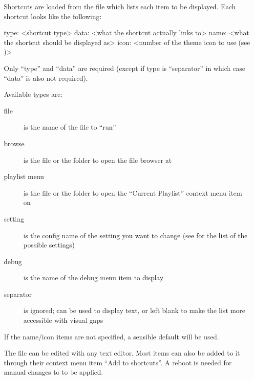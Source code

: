 
Shortcuts are loaded from the file  which lists
each item to be displayed. Each shortcut looks like the following:

\begin{example}
    [shortcut]
    type: <shortcut type>
    data: <what the shortcut actually links to>
    name: <what the shortcut should be displayed as>
    icon: <number of the theme icon to use (see )>
\end{example}

Only ``type'' and ``data'' are required (except if type is ``separator'' in which case
``data'' is also not required).

Available types are:
\begin{description}
\item[file]  is the name of the file to ``run''
\item[browse]  is the file or the folder to open the file browser at
\item[playlist menu]  is the file or the folder to open the
  ``Current Playlist'' context menu item on
\item[setting]  is the config name of the setting you want to change
  (see  for the list of the possible settings)
\item[debug]  is the name of the debug menu item to display
\item[separator]  is ignored;  can be used to display text,
  or left blank to make the list more accessible with visual gaps
\end{description}

If the name/icon items are not specified, a sensible default will be used.


The file  can be edited with any text editor. Most items can
also be added to it through their context menu item ``Add to shortcuts''.
A reboot is needed for manual changes to  to be applied.

